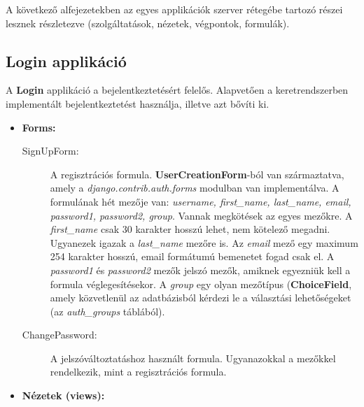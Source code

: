 A következő alfejezetekben az egyes applikációk szerver rétegébe tartozó részei lesznek részletezve (szolgáltatások, nézetek, végpontok, formulák).

\subsection{Login applikáció}

A \textbf{Login} applikáció a bejelentkeztetésért felelős. Alapvetően a keretrendszerben implementált bejelentkeztetést használja, illetve azt bővíti ki.

\begin{itemize}
	\item \textbf{Forms:}

	\begin{description}
		\item[SignUpForm:] A regisztrációs formula. \textbf{UserCreationForm}-ból van származtatva, amely a \textit{django.contrib.auth.forms} modulban van implementálva. A formulának hét mezője van: \textit{username, first\_name, last\_name, email, password1, password2, group}. Vannak megkötések az egyes mezőkre. A \textit{first\_name} csak 30 karakter hosszú lehet, nem kötelező megadni. Ugyanezek igazak a \textit{last\_name} mezőre is. Az \textit{email} mező egy maximum 254 karakter hosszú, email formátumú bemenetet fogad csak el. A \textit{password1} és \textit{password2} mezők jelszó mezők, amiknek egyezniük kell a formula véglegesítésekor. A \textit{group} egy olyan mezőtípus (\textbf{ChoiceField}, amely közvetlenül az adatbázisból kérdezi le a választási lehetőségeket (az \textit{auth\_groups} táblából).
		\item[ChangePassword:] A jelszóváltoztatáshoz használt formula. Ugyanazokkal a mezőkkel rendelkezik, mint a regisztrációs formula.
	\end{description}

	\item \textbf{Nézetek (views):}


\end{itemize}
